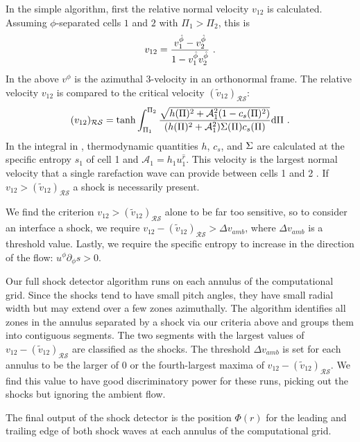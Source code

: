 In the simple algorithm, first the relative normal velocity $v_{12}$ is calculated.  Assuming $\phi$-separated cells $1$ and $2$ with $\Pi_1 > \Pi_2$, this is
\begin{equation}
	v_{12} = \frac{v^{\hat{\phi}}_1 - v^{\hat{\phi}}_2}{1 - v^{\hat{\phi}}_1 v^{\hat{\phi}}_2} \ . \eqlabel{vrel}
\end{equation}
In the above $v^{\hat{\phi}}$ is the azimuthal 3-velocity in an orthonormal frame. The relative velocity $v_{12}$ is compared to the critical velocity $(\tilde{v}_{12})_{\mathcal{R} \mathcal{S}}$:
\begin{equation}
	(v_{12})_{\mathcal{R}\mathcal{S}} = \tanh \int_{\Pi_1}^{\Pi_2} \frac{\sqrt{h(\Pi)^2 + \mathcal{A}_1^2(1-c_s(\Pi)^2)}}{(h(\Pi)^2 + \mathcal{A}_1^2)\Sig(\Pi) c_s(\Pi)} \dd \Pi \ . \eqlabel{vrs}
\end{equation}  
In the integral in , thermodynamic quantities $h$, $c_s$, and $\Sigma$ are calculated at the specific entropy $s_1$ of cell 1 and $\mathcal{A}_1 = h_1 u_1^{\hat{r}}$.  This velocity is the largest normal velocity that a single rarefaction wave can provide between cells 1 and 2    \citep{Rezzolla03}.  If $v_{12} > (\tilde{v}_{12})_{\mathcal{R}\mathcal{S}}$ a shock is necessarily present.

We find the criterion $v_{12} > (\tilde{v}_{12})_{\mathcal{R}\mathcal{S}}$ alone to be far too sensitive, so to consider an interface a shock, we require $v_{12} - (\tilde{v}_{12})_{\mathcal{R}\mathcal{S}} > \Delta v_{amb}$, where $\Delta v_{amb}$ is a threshold value.  Lastly, we require the specific entropy to increase in the direction of the flow: $u^\phi \partial_\phi s > 0$.

Our full shock detector algorithm runs on each annulus of the computational grid.  Since the shocks tend to have small pitch angles, they have small radial width but may extend over a few zones azimuthally.  The algorithm identifies all zones in the annulus separated by a shock via our criteria above and groups them into contiguous segments.  The two segments with the largest values of $v_{12} -  (\tilde{v}_{12})_{\mathcal{R}\mathcal{S}} $ are classified as the shocks. The threshold $\Delta v_{amb}$ is set for each annulus to be the larger of $0$ or the fourth-largest maxima of $v_{12} -  (\tilde{v}_{12})_{\mathcal{R}\mathcal{S}} $. We find this value to have good discriminatory power for these runs, picking out the shocks but ignoring the ambient flow.

The final output of the shock detector is the position $\Phi(r)$ for the leading and trailing edge of both shock waves at each annulus of the computational grid.

